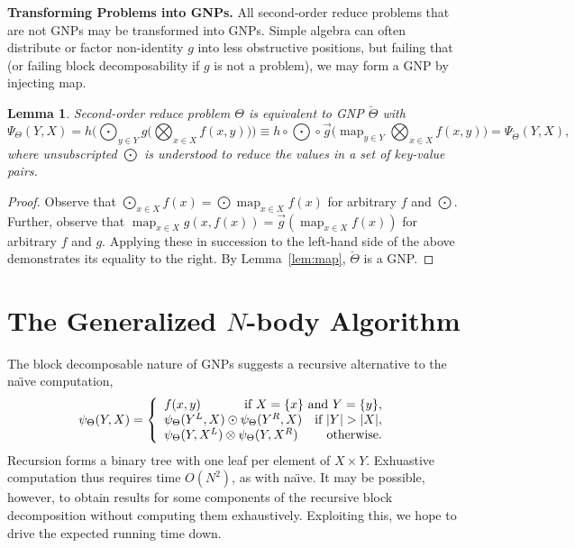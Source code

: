\documentclass{article}
\newtheorem{lemma}{Lemma}
\newcommand{\comp}{\mathop{\circ}\nolimits}
\newcommand{\GNP}{\psi_{\Theta}}
\DeclareMathOperator*{\map}{map}
\begin{document}

{\bf Transforming Problems into GNPs.}  All second-order reduce
problems that are not GNPs may be transformed into GNPs.  Simple
algebra can often distribute or factor non-identity $g$ into less
obstructive positions, but failing that (or failing block
decomposability if $g$ is not a problem), we may form a GNP by
injecting map.
\begin{lemma}
  Second-order reduce problem $\Theta$ is equivalent to
  GNP $\breve{\Theta}$ with
  \[
  \Psi_{\Theta}(Y,X) = h \Big( \bigodot_{y \in Y} g \Big( \bigotimes_{x \in X} f(x,y) \Big) \Big) \equiv h \comp {\textstyle \bigodot} \comp \overrightarrow{g} \Big( \map_{y \in Y} \bigotimes_{x \in X} f(x,y) \Big) = \Psi_{\breve{\Theta}}(Y,X),
  \]
  where unsubscripted $\bigodot$ is understood to reduce the values in
  a set of key-value pairs.
\end{lemma}
\begin{proof}
  Observe that $\bigodot_{x \in X} f(x) = \bigodot{} \map_{x \in X}
  f(x)$ for arbitrary $f$ and $\bigodot$.  Further, observe that
  $\map_{x \in X} g(x,f(x)) = \overrightarrow{g} \left( \map_{x \in X}
  f(x) \right)$ for arbitrary $f$ and $g$.  Applying these in
  succession to the left-hand side of the above demonstrates its
  equality to the right.  By Lemma~\ref{lem:map}, $\breve{\Theta}$ is
  a GNP.
\end{proof}

\section{The Generalized $N$-body Algorithm}

The block decomposable nature of GNPs suggests a recursive alternative
to the na\"{\i}ve computation,
\[
\GNP(Y,X) = \left\{ \begin{array}{lrr}
  f(x,y) & \multicolumn{2}{r}{\mbox{if } X = \{x\} \mbox{ and } Y = \{y\},} \\
  \multicolumn{2}{l}{\GNP(Y^L,X) \odot \GNP(Y^R,X)} & \mbox{if } |Y| > |X|, \\
  \multicolumn{2}{l}{\GNP(Y,X^L) \otimes \GNP(Y,X^R)} & \mbox{otherwise}.
\end{array} \right.
\]
Recursion forms a binary tree with one leaf per element of $X \times
Y$.  Exhuastive computation thus requires time $O(N^2)$, as with
na\"{\i}ve.  It may be possible, however, to obtain results for some
components of the recursive block decomposition without computing them
exhaustively.  Exploiting this, we hope to drive the expected running
time down.
\end{document}
